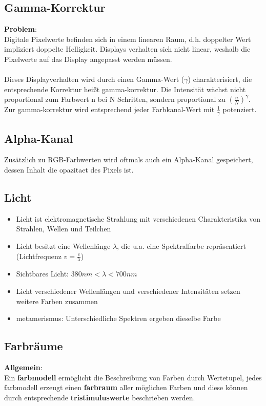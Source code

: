 \documentclass[10pt,a4paper]{article}
\begin{document}
	\subsection{Gamma-Korrektur}
	\textbf{Problem}:\\
	Digitale Pixelwerte befinden sich in einem linearen Raum, d.h. doppelter Wert impliziert doppelte Helligkeit. Displays verhalten sich nicht linear, weshalb die Pixelwerte auf das Display angepasst werden müssen.
	\\\\
	Dieses Displayverhalten wird durch einen Gamma-Wert ($\gamma$) charakterisiert, die entsprechende Korrektur heißt \Gls{gamma-korrektur}. Die Intensität wächst nicht proportional zum Farbwert n bei N Schritten, sondern proportional zu $(\frac{n}{N})^{\gamma}$. Zur \Gls{gamma-korrektur} wird entsprechend jeder Farbkanal-Wert mit $\frac{1}{\gamma}$ potenziert.

	\subsection{Alpha-Kanal}
	Zusätzlich zu RGB-Farbwerten wird oftmals auch ein Alpha-Kanal gespeichert, dessen Inhalt die \Gls{opazitaet} des Pixels ist.

	\subsection{Licht}
	\begin{itemize}
		\item Licht ist elektromagnetische Strahlung mit verschiedenen Charakteristika von Strahlen, Wellen und Teilchen
		\item Licht besitzt eine Wellenlänge $\lambda$, die u.a. eine Spektralfarbe repräsentiert (Lichtfrequenz $v = \frac{c}{\lambda}$)
		\item Sichtbares Licht: $380nm < \lambda < 700nm$
		\item Licht verschiedener Wellenlängen und verschiedener Intensitäten setzen weitere Farben zusammen
		\item \Gls{metamerismus}: Unterschiedliche Spektren ergeben dieselbe Farbe
	\end{itemize}

	\subsection{Farbräume}
	\textbf{Allgemein}:\\
	Ein \textbf{\Gls{farbmodell}} ermöglicht die Beschreibung von Farben durch Wertetupel, jedes \Gls{farbmodell} erzeugt einen \textbf{\Gls{farbraum}} aller möglichen Farben und diese können durch entsprechende \textbf{\Gls{tristimuluswerte}} beschrieben werden.
\end{document}
